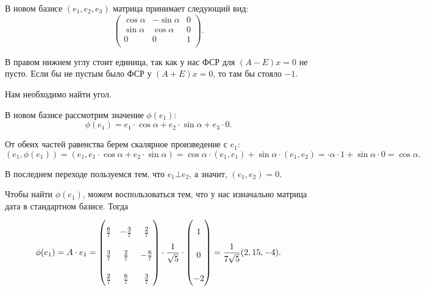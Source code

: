 \documentclass[a4paper]{article}
\begin{document}
\begin{enumerate}
\begin{solution}
            В новом базисе $(e_1, e_2, e_3)$ матрица принимает следующий вид:
            \begin{equation*}
                \begin{pmatrix}
                    \cos \alpha & -\sin \alpha & 0 \\
                    \sin \alpha & \cos \alpha & 0 \\
                    0 & 0 & 1 \\
                \end{pmatrix}.
            \end{equation*}

            В правом нижнем углу стоит единица, так как у нас ФСР для $(A - E)x = 0$ не пусто. Если бы не пустым было ФСР у $(A + E)x = 0$, то там бы стояло $-1$.

            Нам необходимо найти угол.

            В новом базисе рассмотрим значение $\phi(e_1)$:
            \begin{equation*}
                \phi(e_1) = e_1 \cdot \cos \alpha + e_2 \cdot \sin \alpha + e_3 \cdot 0.
            \end{equation*}

            От обеих частей равенства берем скалярное произведение с $e_1$:
            \begin{equation*}
                (e_1, \phi(e_1)) = (e_1, e_1 \cdot \cos \alpha + e_2 \cdot \sin \alpha) = \cos \alpha \cdot (e_1, e_1) + \sin \alpha \cdot (e_1, e_2) = \cdot \alpha \cdot 1 + \sin \alpha \cdot 0 = \cos \alpha.
            \end{equation*}

            В последнем переходе пользуемся тем, что $e_1 \bot e_2$, а значит, $(e_1, e_2) = 0$.

            Чтобы найти $\phi(e_1)$, можем воспользоваться тем, что у нас изначально матрица дата в стандартном базисе. Тогда
            \begin{equation*}
                \phi(e_1) = A \cdot e_1 = {\renewcommand{\arraystretch}{2.3}\begin{pmatrix}
                    \frac{6}{7} & -\frac{3}{7} & \frac{2}{7} \\
                    \frac{3}{7} & \frac{2}{7} & -\frac{6}{7} \\
                    \frac{2}{7} & \frac{6}{7} & \frac{3}{7} \\
                \end{pmatrix}} \cdot \dfrac{1}{\sqrt{5}} \cdot \begin{pmatrix}
                    1 \\ 0 \\ -2 \\
                \end{pmatrix}
                = \dfrac{1}{7 \sqrt{5}} (2, 15, -4).
            \end{equation*}


\end{solution}
\end{enumerate}
\end{document}
